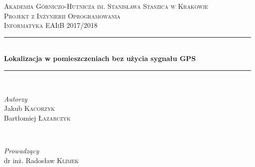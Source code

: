 \documentclass[11pt]{article}
\begin{document}
	
	\begin{titlepage} 
	
		\newcommand{\HRule}{\rule{\linewidth}{0.5mm}} %
		
		\center %
		
		
		\textsc{\LARGE Akademia Górniczo-Hutnicza im. Stanisława Staszica w Krakowie}\\[1.5cm] %
		
		\textsc{\Large Projekt z Inżynierii Oprogramowania}\\[0.5cm] %
		
		\textsc{\large Informatyka EAIiB 2017/2018}\\[0.5cm] %
		
		
		\HRule\\[0.4cm]
		
		{\huge\bfseries Lokalizacja w pomieszczeniach bez użycia sygnału GPS}\\[0.4cm] %
		
		\HRule\\[1.5cm]
		
		
		\begin{minipage}{0.4\textwidth}
			\begin{flushleft}
				\large
				\textit{Autorzy}\\
				Jakub \textsc{Kacorzyk} \\
				Bartłomiej \textsc{Łazarczyk}
			\end{flushleft}
		\end{minipage}
		~
		\begin{minipage}{0.4\textwidth}
			\begin{flushright}
				\large
				\textit{Prowadzący}\\
				dr inż. Radosław \textsc{Klimek} %
			\end{flushright}
		\end{minipage}
		

\end{titlepage}
\end{document}
